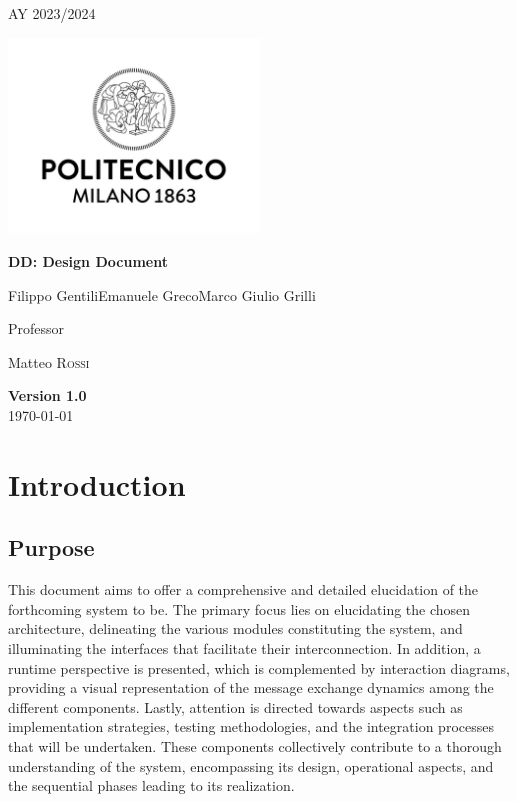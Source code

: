 \documentclass[12pt,oneside,a4paper]{article}
\begin{document}
\begin{titlepage}
    \centering
    {\scshape\large AY 2023/2024 \par}
    \vfill
    \includegraphics[width=0.5\textwidth]{Images/poli.jpg}\par\vspace{1cm}
    \vspace{1.5cm}
    {\huge\bfseries DD\@: Design Document \par}
    \vspace{2cm}
    {\Large {Filippo Gentili\quad Emanuele Greco\quad Marco Giulio Grilli}\par}
    \vfill
    {\large Professor\par
        Matteo \textsc{Rossi}}
    \vfill
    {\large \textbf{Version 1.0}\\ \today \par}
\end{titlepage}

\tableofcontents

\pagebreak

\section{Introduction}

\subsection{Purpose}
This document aims to offer a comprehensive and detailed elucidation of the forthcoming system to be. The primary focus lies on elucidating the chosen architecture, delineating the various modules constituting the system, and illuminating the interfaces that facilitate their interconnection. In addition, a runtime perspective is presented, which is complemented by interaction diagrams, providing a visual representation of the message exchange dynamics among the different components. Lastly, attention is directed towards aspects such as implementation strategies, testing methodologies, and the integration processes that will be undertaken. These components collectively contribute to a thorough understanding of the system, encompassing its design, operational aspects, and the sequential phases leading to its realization.
\end{document}
